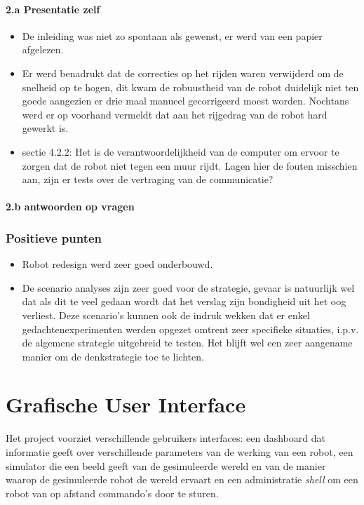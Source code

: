\documentclass[12pt,a4paper]{report}
\begin{document}
	\subsubsection{2.a Presentatie zelf}
\begin{itemize}
	\item De inleiding was niet zo spontaan als gewenst, er werd van een papier afgelezen.
	\item Er werd benadrukt dat de correcties op het rijden waren verwijderd om de snelheid op te hogen, dit kwam de robuustheid van de robot duidelijk niet ten goede aangezien er drie maal manueel gecorrigeerd moest worden. Nochtans werd er op voorhand vermeldt dat aan het rijgedrag van de robot hard gewerkt is.
	\item sectie 4.2.2: Het is de verantwoordelijkheid van de computer om ervoor te zorgen dat de robot niet tegen een muur rijdt. Lagen hier de fouten misschien aan, zijn er tests over de vertraging van de communicatie?
\end{itemize}
     \subsubsection{2.b antwoorden op vragen}
\subsection{ Positieve punten}
\begin{itemize}
	\item Robot redesign werd zeer goed onderbouwd.
	\item De scenario analyses zijn zeer goed voor de strategie, gevaar is natuurlijk wel dat als dit te veel gedaan wordt dat het verslag zijn bondigheid uit het oog verliest. Deze scenario's kunnen ook de indruk wekken dat er enkel gedachtenexperimenten werden opgezet omtrent zeer specifieke situaties, i.p.v. de algemene strategie uitgebreid te testen. Het blijft wel een zeer aangename manier om de denkstrategie toe te lichten.
\end{itemize}
 
\chapter{Grafische User Interface}

Het project voorziet verschillende gebruikers interfaces: een dashboard dat informatie geeft over verschillende parameters van de werking van een robot, een simulator die een beeld geeft van de gesimuleerde wereld en van de manier waarop de gesimuleerde robot de wereld ervaart en een administratie \emph{shell} om een robot van op afstand commando's door te sturen.
\end{document}
